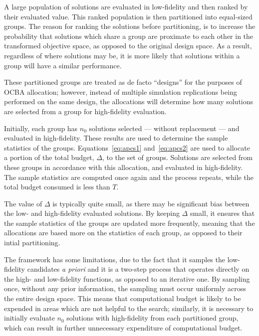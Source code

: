 A large population of solutions are evaluated in low-fidelity and then ranked by their evaluated value. This ranked population is then partitioned into equal-sized groups. The reason for ranking the solutions before partitioning, is to increase the probability that solutions which share a group are proximate to each other in the transformed objective space, as opposed to the original design space. As a result, regardless of where solutions may be, it is more likely that solutions within a group will have a similar performance.

These partitioned groups are treated as de facto ``designs'' for the purposes of OCBA allocation; however, instead of multiple simulation replications being performed on the same design, the allocations will determine how many solutions are selected from a group for high-fidelity evaluation.

Initially, each group has $n_0$ solutions selected --- without replacement --- and evaluated in high-fidelity. These results are used to determine the sample statistics of the groups. Equations~\ref{eq:apcs1} and~\ref{eq:apcs2} are used to allocate a portion of the total budget, $\Delta$, to the set of groups. Solutions are selected from these groups in accordance with this allocation, and evaluated in high-fidelity. The sample statistics are computed once again and the process repeats, while the total budget consumed is less than $T$.

The value of $\Delta$ is typically quite small, as there may be significant bias between the low- and high-fidelity evaluated solutions. By keeping $\Delta$ small, it ensures that the sample statistics of the groups are updated more frequently, meaning that the allocations are based more on the statistics of each group, as opposed to their intial partitioning.

The \motos{} framework has some limitations, due to the fact that it samples the low-fidelity candidates \emph{a priori} and it is a two-step process that operates directly on the high- and low-fidelity functions, as opposed to an iterative one. By sampling once, without any prior information, the sampling must occur uniformly across the entire design space. This means that computational budget is likely to be expended in areas which are not helpful to the search; similarly, it is necessary to initially evaluate $n_0$ solutions with high-fidelity from each partitioned group, which can result in further unnecessary expenditure of computational budget.%

